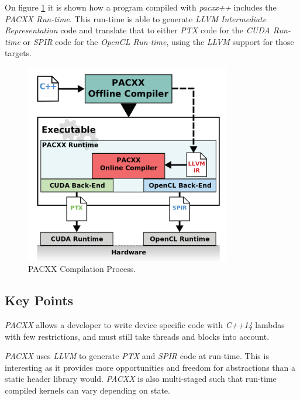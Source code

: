 On figure \ref{fig:pacxxCompilation} it is shown how a program compiled with \textit{pacxx++} includes the \textit{PACXX Run-time}. This run-time is able to generate \textit{LLVM Intermediate Representation} code and translate that to either \textit{PTX} code for the \textit{CUDA Run-time} or \textit{SPIR} code for the \textit{OpenCL Run-time}, using the \textit{LLVM} support for those targets.
\begin{figure}[H]
\center
\includegraphics[width=0.8\textwidth]{chapters/relatedWorks/figures/pacxx_compilation_cool.png}
\caption{PACXX Compilation Process\cite{pacxxPaper2}.}
\label{fig:pacxxCompilation}
\end{figure}

\subsection{Key Points}
\textit{PACXX} allows a developer to write device specific code with \textit{C++14} lambdas with few restrictions, and must still take threads and blocks into account. 

\textit{PACXX} uses \textit{LLVM} to generate \textit{PTX} and \textit{SPIR} code at run-time. This is interesting as it provides more opportunities and freedom for abstractions than a static header library would. \textit{PACXX} is also multi-staged such that run-time compiled kernels can vary depending on state.
